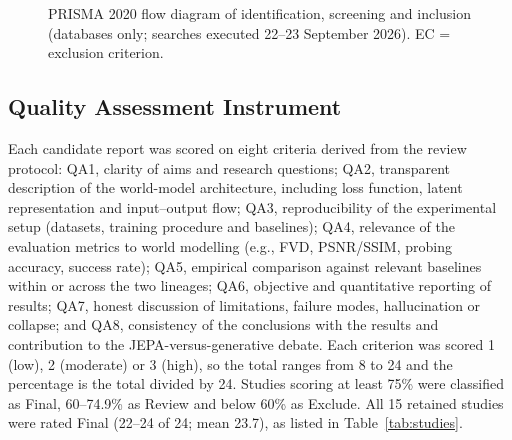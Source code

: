 \documentclass[conference,a4paper]{IEEEtran}
\begin{document}
\begin{figure}[!t]
\caption{PRISMA 2020 flow diagram of identification, screening and inclusion (databases only; searches executed 22--23 September 2026). EC = exclusion criterion.}
\label{fig:prisma}
\end{figure}

\subsection{Quality Assessment Instrument}
Each candidate report was scored on eight criteria derived from the review protocol: QA1, clarity of aims and research questions; QA2, transparent description of the world-model architecture, including loss function, latent representation and input--output flow; QA3, reproducibility of the experimental setup (datasets, training procedure and baselines); QA4, relevance of the evaluation metrics to world modelling (e.g., FVD, PSNR/SSIM, probing accuracy, success rate); QA5, empirical comparison against relevant baselines within or across the two lineages; QA6, objective and quantitative reporting of results; QA7, honest discussion of limitations, failure modes, hallucination or collapse; and QA8, consistency of the conclusions with the results and contribution to the JEPA-versus-generative debate. Each criterion was scored 1 (low), 2 (moderate) or 3 (high), so the total ranges from 8 to 24 and the percentage is the total divided by 24. Studies scoring at least 75\% were classified as Final, 60--74.9\% as Review and below 60\% as Exclude. All 15 retained studies were rated Final (22--24 of 24; mean 23.7), as listed in Table~\ref{tab:studies}.
\end{document}
